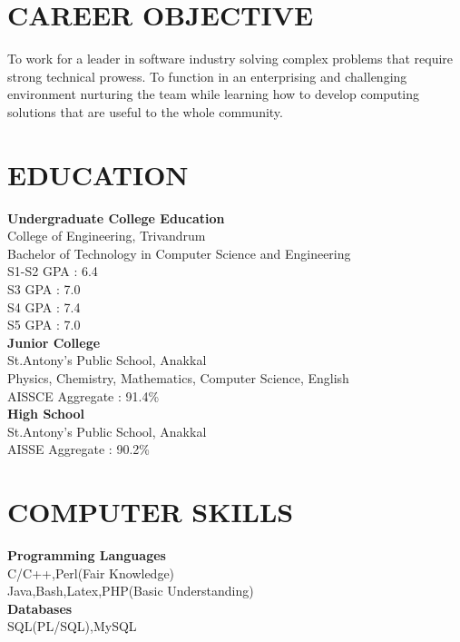 \documentclass[line,margin]{res}
\begin{document}


\address{joji\_antony@gmx.com}
\address{+91 98092 28749}

\begin{resume}
\section{CAREER OBJECTIVE}
To work for a leader in software industry solving complex problems that require strong technical prowess. To function in an enterprising and challenging environment nurturing the team while learning how to develop computing solutions that are useful to the whole community.
  
  \section{EDUCATION}

{\bf Undergraduate College Education}\\
College of Engineering, Trivandrum\\
Bachelor of Technology in Computer Science and Engineering\\
S1-S2 GPA : 6.4\\
S3 GPA    : 7.0\\
S4 GPA    : 7.4\\
S5 GPA    : 7.0\\

{\bf Junior College} \\
St.Antony's Public School, Anakkal\\
Physics, Chemistry, Mathematics, Computer Science, English\\
AISSCE Aggregate : 91.4\%\\

{\bf High School} \\
St.Antony's Public School, Anakkal\\
AISSE Aggregate : 90.2\%\\

\section{COMPUTER SKILLS}
{\bf Programming Languages}\\
C/C++,Perl(Fair Knowledge)\\
Java,Bash,Latex,PHP(Basic Understanding)\\
{\bf Databases}\\
SQL(PL/SQL),MySQL\\


\end{resume}
\end{document}
